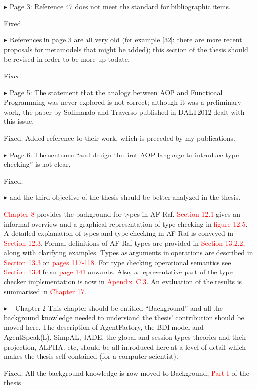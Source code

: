 \documentclass{article}
\newcommand*\R[1]{\textcolor{red}{#1}} %
\newenvironment{them}%
  {\bigskip\noindent\begingroup\color{blue}$\blacktriangleright$\enspace}%
  {\endgroup\par}
\begin{document}
\begin{them}
Page 3:
Reference 47 does not meet the standard for bibliographic items.
\end{them}
Fixed.

\begin{them}
References in page 3 are all very old (for example [32]: there are more recent
proposals for metamodels that might be added); this section of the thesis
should be revised in order to be more up-todate.
\end{them}
Fixed.

\begin{them}
Page 5:
The statement that the analogy between AOP and Functional Programming was never
explored is not correct; although it was a preliminary work, the paper by
Solimando and Traverso published in DALT2012 dealt with this issue.
\end{them}
Fixed. Added reference to their work, which is preceded by my publications.

\begin{them}
Page 6:
The sentence ``and design the first AOP language to introduce type checking'' is
not clear,
\end{them}
Fixed.

\begin{them}
and the third objective of the thesis should be better analyzed in
the thesis.
\end{them}
\R{Chapter 8} provides the background for types in AF-Raf. \R{Section 12.1}
gives an informal overview and a graphical representation of type checking in
\R{figure 12.5}. A detailed explanation of types and type checking in AF-Raf is
conveyed in \R{Section 12.3}. Formal definitions of AF-Raf types are provided
in \R{Section 13.2.2}, along with clarifying examples. Types as arguments in
operations are described in \R{Section 13.3 } on \R{pages 117-118}. For type
checking operational semantics see \R{Section 13.4} from \R{page 141} onwards.
Also, a representative part of the type checker implementation is now in
\R{Apendix~C.3}. An evaluation of the results is summarised in \R{Chapter 17}.

\begin{them}
-- Chapter 2
This chapter should be entitled ``Background'' and all the background knowledge
needed to understand the thesis' contribution should be moved here. The
description of AgentFactory, the BDI model and AgentSpeak(L), SimpAL, JADE, the
global and session types theories and their projection, ALPHA, etc, should be
all introduced here at a level of detail which makes the thesis self-contained
(for a computer scientist).
\end{them}
Fixed. All the background knowledge is now moved to Background, \R{Part I} of
the thesis
\end{document}
